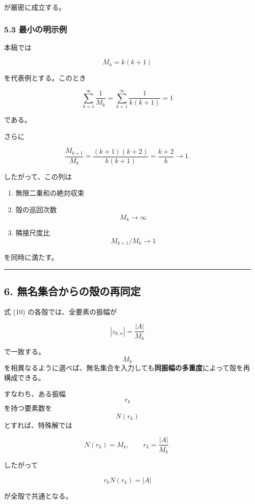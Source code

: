 \documentclass[
  a4paper,
]{ltjsarticle}
\providecommand{\tightlist}{%
  \setlength{\itemsep}{0pt}\setlength{\parskip}{0pt}}
\begin{document}
が厳密に成立する。

\subsubsection{5.3
最小の明示例}\label{ux6700ux5c0fux306eux660eux793aux4f8b}

本稿では

\[
\boxed{
M_k=k(k+1)
}
\tag{16}
\]

を代表例とする。このとき

\[
\sum_{k=1}^{\infty}\frac{1}{M_k}
=
\sum_{k=1}^{\infty}
\frac{1}{k(k+1)}
=1
\tag{17}
\]

である。

さらに

\[
\frac{M_{k+1}}{M_k}
=
\frac{(k+1)(k+2)}{k(k+1)}
=
\frac{k+2}{k}
\longrightarrow1.
\tag{18}
\]

したがって、この列は

\begin{enumerate}
\def\labelenumi{\arabic{enumi}.}
\tightlist
\item
  無限二乗和の絶対収束
\item
  殻の巡回次数 \[M_k\to\infty\]
\item
  隣接尺度比 \[M_{k+1}/M_k\to1\]
\end{enumerate}

を同時に満たす。

\begin{center}\rule{0.5\linewidth}{0.5pt}\end{center}

\subsection{6.
無名集合からの殻の再同定}\label{ux7121ux540dux96c6ux5408ux304bux3089ux306eux6bbbux306eux518dux540cux5b9a}

式 (10) の各殻では、全要素の振幅が

\[
|z_{k,n}|
=
\frac{|A|}{M_k}
\tag{19}
\]

で一致する。\[M_k\]
を相異なるように選べば、無名集合を入力しても\textbf{同振幅の多重度}によって殻を再構成できる。

すなわち、ある振幅 \[r_k\] を持つ要素数を \[N(r_k)\]
とすれば、特殊解では

\[
N(r_k)=M_k,
\qquad
r_k=\frac{|A|}{M_k}.
\tag{20}
\]

したがって

\[
\boxed{
r_kN(r_k)=|A|
}
\tag{21}
\]

が全殻で共通となる。
\end{document}
